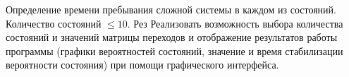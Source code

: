 Определение времени пребывания сложной системы в каждом из состояний. Количество состояний $\le 10$. Рез
Реализовать возможность выбора количества состояний и значений матрицы переходов и отображение результатов работы программы (графики вероятностей состояний, значение и время стабилизации вероятности состояния) при помощи графического интерфейса.

